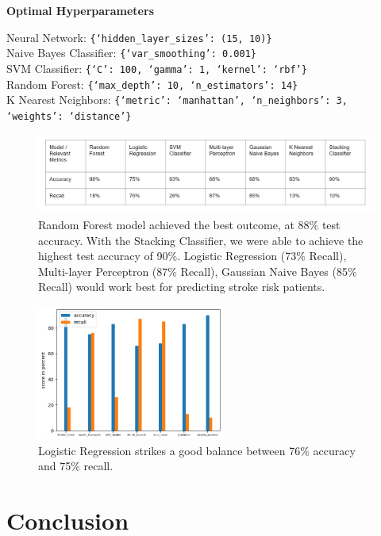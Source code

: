 \documentclass[11pt]{article}
\begin{document}
\medskip

\textbf{Optimal Hyperparameters}

Neural Network: \texttt{\{`hidden\_layer\_sizes': (15, 10)\}} \\
Naive Bayes Classifier: \texttt{\{`var\_smoothing': 0.001\}} \\
SVM Classifier: \texttt{\{`C': 100, `gamma': 1, `kernel': `rbf'\}} \\
Random Forest: \texttt{\{`max\_depth': 10, `n\_estimators': 14\}} \\
K Nearest Neighbors: \texttt{\{`metric': `manhattan', `n\_neighbors': 3, `weights': `distance'\}}

\begin{figure}[ht]
\centering
\includegraphics[width=1\textwidth]{table.png}
\caption{Random Forest model achieved the best outcome, at 88\% test accuracy. With the Stacking Classifier, we were able to achieve the highest test accuracy of 90\%. Logistic Regression (73\% Recall), Multi-layer Perceptron (87\% Recall),  Gaussian Naive Bayes (85\% Recall) would work best for predicting stroke risk patients.}
\end{figure}

\begin{figure}[ht]
\centering
\includegraphics[width=0.55\textwidth]{Models.png}
\caption{Logistic Regression strikes a good balance between 76\% accuracy and 75\% recall.}
\end{figure}

\section*{Conclusion}
\end{document}
